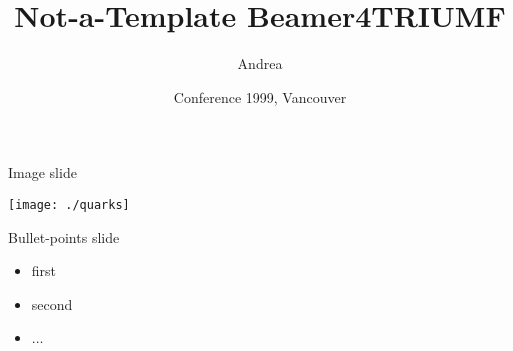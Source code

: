 \documentclass[aspectratio=169]{beamer}
\title[Beamer4TRIUMF]{Not-a-Template Beamer4TRIUMF} %
\author[Andrea]{Andrea}
\institute[TRIUMF]{\texttt{[image: ./TRIUMF\_Logo\_Blue.png]}}
\date[9/9/1999]{Conference 1999, Vancouver}
\begin{document}
\begin{frame}
\titlepage %
\end{frame}

\begin{frame}{Image slide}
  \begin{center}
  \texttt{[image: ./quarks]}
   \end{center}
   
\end{frame}

\begin{frame}{Bullet-points slide}
  \begin{itemize}
  \item first
  \item second
  \item $\ldots$
 \end{itemize}

\end{frame}
\end{document}
